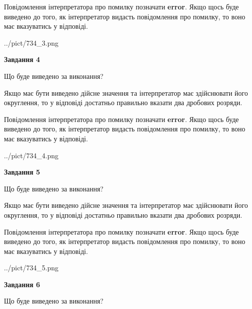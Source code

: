 \documentclass[12pt, ukrainian]{article}
\begin{document}
{\begin {Large}
Повідомлення інтерпретатора про помилку позначати \textbf{error}.
Якщо щось буде виведено до того, як інтерпретатор видасть повідомлення про помилку, 
то воно має вказуватись у відповіді. \par

\begin{center}
	{../pict/734_3.png}
\end{center}
\newpage

{\begin {center}\textbf{Завдання 4}\end {center}}\par
Що буде виведено за виконання? \par

Якщо має бути виведено дійсне значення та інтерпретатор має здійснювати його округлення, 
то у відповіді достатньо правильно вказати два дробових розряди.

Повідомлення інтерпретатора про помилку позначати \textbf{error}.
Якщо щось буде виведено до того, як інтерпретатор видасть повідомлення про помилку, 
то воно має вказуватись у відповіді. \par

\begin{center}
	{../pict/734_4.png}
\end{center}
\newpage

{\begin {center}\textbf{Завдання 5}\end {center}}\par
Що буде виведено за виконання? \par

Якщо має бути виведено дійсне значення та інтерпретатор має здійснювати його округлення, 
то у відповіді достатньо правильно вказати два дробових розряди.

Повідомлення інтерпретатора про помилку позначати \textbf{error}.
Якщо щось буде виведено до того, як інтерпретатор видасть повідомлення про помилку, 
то воно має вказуватись у відповіді. \par

\begin{center}
	{../pict/734_5.png}
\end{center}
\newpage

{\begin {center}\textbf{Завдання 6}\end {center}}\par
Що буде виведено за виконання? \par


\end{Large}}
\end{document}
